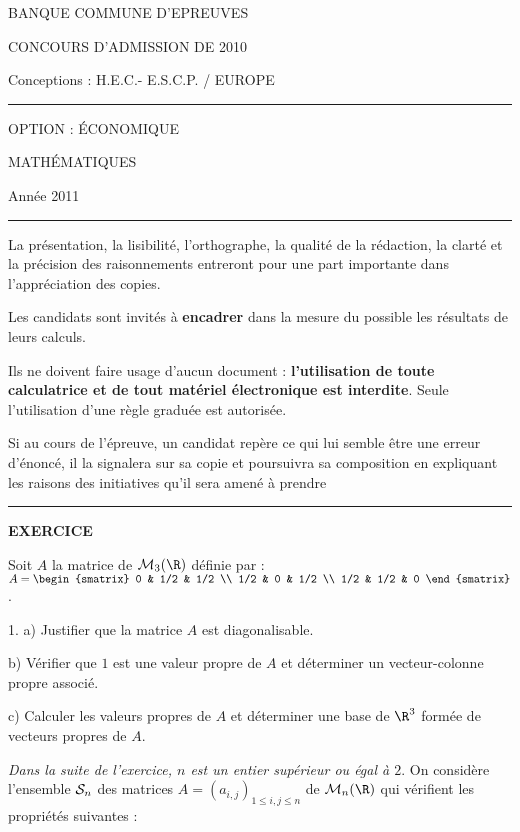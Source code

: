 \documentclass[11pt]{article}%
\begin{document}
\begin{center}
{\LARGE BANQUE COMMUNE D'EPREUVES}

{\large CONCOURS D'ADMISSION DE 2010}

{\large Conceptions : H.E.C.- E.S.C.P. / EUROPE}

\rule{2.39cm}{0.05cm}

{\large OPTION : ÉCONOMIQUE}

{\Huge MATHÉMATIQUES }

Année 2011

\rule{2.39cm}{0.05cm}
\end{center}

La présentation, la lisibilité, l'orthographe, la qualité de la
rédaction, la clarté et la précision des raisonnements entreront
pour une part importante dans l'appréciation des copies.

Les candidats sont invités à \textbf{encadrer} dans la mesure du
possible les résultats de leurs calculs.

Ils ne doivent faire usage d'aucun document : \textbf{l'utilisation de
toute
calculatrice et de tout matériel électronique est interdite}. Seule
l'utilisation d'une règle graduée est autorisée.

Si au cours de l'épreuve, un candidat repère ce qui lui semble être une
erreur d'énoncé, il la signalera sur sa copie et poursuivra
sa composition en expliquant les raisons des initiatives qu'il sera
amené
à prendre

\begin{center}
\rule{16.5cm}{0.05cm}
\end{center}
 \centerline{\bf EXERCICE}
 

 Soit $A$ la matrice de ${\cal M}_{3}(\R)$ définie par : $A = 
\begin{smatrix}
0 & 1/2 & 1/2 \\
1/2 & 0 & 1/2 \\
1/2 & 1/2 & 0
\end{smatrix}
$.
 
 1. a) Justifier que la matrice $A$ est diagonalisable.
 
 b) Vérifier que $1$ est une valeur propre de $A$ et déterminer un
vecteur-colonne propre associé.
 
 c) Calculer les valeurs propres de $A$ et déterminer une base de
$\R^{3}$ formée de vecteurs propres de $A$.

 

 {\sl Dans la suite de l'exercice, $n$ est un entier supérieur ou égal
à $2$}. On considère l'ensemble ${\cal S}_{n}$ des matrices $A =
(a_{i,j})_{1\leq i,j\leq n}$ de ${\cal M}_{n}(\R)$ qui vérifient les
propriétés suivantes :
 
\end{document}
